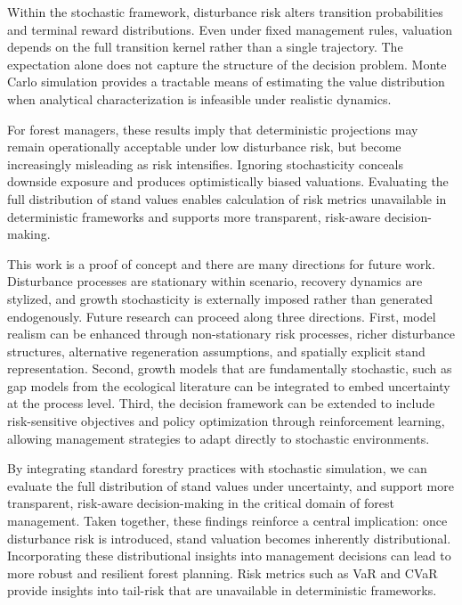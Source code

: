 \documentclass[12pt]{report}
\begin{document}
Within the stochastic framework, disturbance risk alters transition probabilities and terminal reward distributions. Even under fixed management rules, valuation depends on the full transition kernel rather than a single trajectory. The expectation alone does not capture the structure of the decision problem. Monte Carlo simulation provides a tractable means of estimating the value distribution when analytical characterization is infeasible under realistic dynamics.

For forest managers, these results imply that deterministic projections may remain operationally acceptable under 
low disturbance risk, but become increasingly misleading as risk intensifies. Ignoring stochasticity conceals 
downside exposure and produces optimistically biased valuations. Evaluating the full distribution of stand values 
enables calculation of risk metrics unavailable in deterministic frameworks and supports more transparent, 
risk-aware decision-making.

This work is a proof of concept and there are many directions for future work. Disturbance processes are 
stationary within scenario, recovery dynamics are stylized, and growth stochasticity is externally imposed 
rather than generated endogenously. Future research can proceed along three directions. First, model realism can 
be enhanced through non-stationary risk processes, richer disturbance structures, alternative regeneration 
assumptions, and spatially explicit stand representation. Second, growth models that are fundamentally stochastic, 
such as gap models from the ecological literature \parencite{pabstCalibratingTestingGap2008} can be integrated to 
embed uncertainty at the process level. Third, the decision framework can be extended to include risk-sensitive 
objectives and policy optimization through reinforcement learning, allowing management strategies to adapt 
directly to stochastic environments.

By integrating standard forestry practices with stochastic simulation, we can evaluate the full distribution of stand values 
under uncertainty, and support more transparent, risk-aware decision-making in the critical domain of forest 
management. Taken together, these findings reinforce a central implication: once disturbance risk is introduced, 
stand valuation becomes inherently distributional. Incorporating these distributional insights into management 
decisions can lead to more robust and resilient forest planning. Risk metrics such as VaR and CVaR provide insights into tail-risk that are unavailable in deterministic frameworks.
\end{document}
